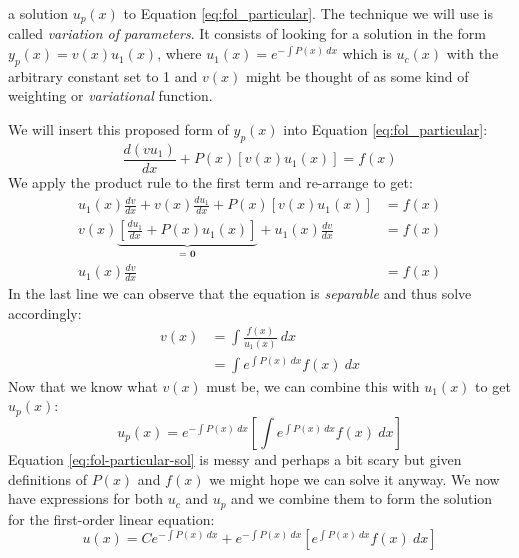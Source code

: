  a solution $u_p(x)$ to Equation \ref{eq:fol_particular}.  The technique we will use is called \emph{variation of parameters}.  It consists of looking for a solution in the form $y_p(x) = v(x)u_1(x)$, where $u_1(x) = e^{-\int P(x) \ dx}$ which is $u_c(x)$ with the arbitrary constant set to 1 and $v(x)$ might be thought of as some kind of weighting or \emph{variational} function.

\vspace{0.25cm}

\noindent We will insert this proposed form of $y_p(x)$ into Equation \ref{eq:fol_particular}:
\begin{equation*}
\frac{d(vu_1)}{dx} + P(x)\left[v(x)u_1(x)\right]=f(x)
\end{equation*}
We apply the product rule to the first term and re-arrange to get:
\begin{align*}
u_1(x)\frac{dv}{dx}+ v(x)\frac{du_1}{dx} + P(x)\left[v(x)u_1(x)\right] &= f(x) \\
v(x)\underbrace{\left[\frac{du_1}{dx}+P(x)u_1(x) \right]}_{\textbf{= 0}}+u_1(x)\frac{dv}{dx} &= f(x) \\
u_1(x)\frac{dv}{dx} &= f(x)
\end{align*}
In the last line we can observe that the equation is \emph{separable} and thus solve accordingly:
\begin{align*}
v(x) &= \int \frac{f(x)}{u_1(x)} \ dx \\
     &= \int e^{\int P(x) \ dx}f(x) \ dx
\end{align*}
Now that we know what $v(x)$ must be, we can combine this with $u_1(x)$ to get $u_p(x)$:
\begin{equation}
u_p(x) = e^{-\int P(x) \ dx}\left[\int e^{\int P(x) \ dx}f(x) \ dx \right]
\label{eq:fol-particular-sol}
\end{equation}
Equation \ref{eq:fol-particular-sol} is messy and perhaps a bit scary but given definitions of $P(x)$ and $f(x)$ we might hope we can solve it anyway.  We now have expressions for both $u_c$ and $u_p$ and we combine them to form the solution for the first-order linear equation:
\begin{equation}
u(x) = Ce^{-\int P(x) \ dx} + e^{-\int P(x) \ dx} \left[e^{\int P(x) \ dx} f(x) \ dx \right]
\label{eq:fol-solution}
\end{equation}


